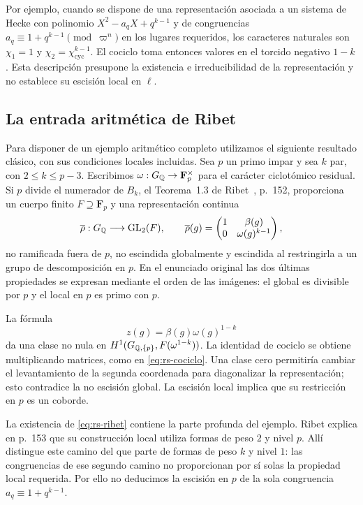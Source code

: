 Por ejemplo, cuando se dispone de una representación asociada a
un sistema de Hecke con polinomio
$X^2-a_qX+q^{k-1}$ y de congruencias
$a_q\equiv1+q^{k-1}\pmod{\varpi^n}$ en los lugares requeridos,
los caracteres naturales son $\chi_1=1$ y
$\chi_2=\chi_{\mathrm{cyc}}^{k-1}$. El cociclo toma entonces valores
en el torcido negativo $1-k$. Esta descripción presupone la
existencia e irreducibilidad de la representación y no establece
su escisión local en $\ell$.

\subsection{La entrada aritmética de Ribet}
\label{subsec:rs-ribet}

Para disponer de un ejemplo aritmético completo utilizamos el
siguiente resultado clásico, con sus condiciones locales incluidas.
Sea $p$ un primo impar y sea $k$ par, con $2\le k\le p-3$.
Escribimos $\omega:G_{\mathbb{Q}}\to\mathbf F_p^\times$ para el carácter
ciclotómico residual. Si $p$ divide el numerador de $B_k$,
el Teorema~1.3 de Ribet~\cite{ribet-congruencias}, p.~152,
proporciona un cuerpo finito $F\supseteq\mathbf F_p$ y una
representación continua
\begin{equation}
 \overline\rho:G_{\mathbb{Q}}\longrightarrow\operatorname{GL}_2(F),
 \qquad
 \overline\rho(g)=
 \begin{pmatrix}1&\beta(g)\\0&\omega(g)^{k-1}\end{pmatrix},
 \label{eq:rs-ribet}
\end{equation}
no ramificada fuera de $p$, no escindida globalmente y
escindida al restringirla a un grupo de descomposición en $p$.
En el enunciado original las dos últimas propiedades se expresan
mediante el orden de las imágenes: el global es divisible por $p$
y el local en $p$ es primo con $p$.

La fórmula
\begin{equation}
 z(g)=\beta(g)\omega(g)^{1-k}
 \label{eq:rs-ribet-cociclo}
\end{equation}
da una clase no nula en
$H^1(G_{\mathbb{Q},\{p\}},F(\omega^{1-k}))$.
La identidad de cociclo se obtiene multiplicando matrices,
como en \eqref{eq:rs-cociclo}. Una clase cero permitiría cambiar
el levantamiento de la segunda coordenada para diagonalizar la
representación; esto contradice la no escisión global.
La escisión local implica que su restricción en $p$ es un coborde.

La existencia de \eqref{eq:rs-ribet} contiene la parte profunda del
ejemplo. Ribet explica en p.~153 que su construcción local utiliza
formas de peso $2$ y nivel $p$. Allí distingue este camino del
que parte de formas de peso $k$ y nivel $1$: las congruencias de
ese segundo camino no proporcionan por sí solas la propiedad
local requerida. Por ello no deducimos la escisión en $p$ de la
sola congruencia $a_q\equiv1+q^{k-1}$.


